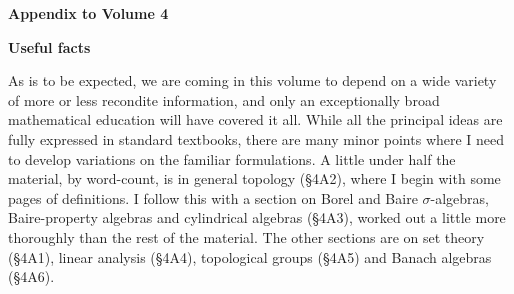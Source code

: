       
\def\chaptername{Appendix} 
\def\sectionname{Introduction} 
      
\gdef\topparagraph{} 
\gdef\bottomparagraph{Appendix to Vol.\ 4 {\it intro.}} 
      
\centerline{\bf Appendix to Volume 4} 
      
\medskip 
      
\centerline{\bf Useful facts} 
      
\medskip 
      
As is to be expected, we are coming in this volume to depend on a wide 
variety of more or less recondite information, and only an exceptionally 
broad mathematical education will have covered it all.   While all the 
principal ideas are fully expressed in standard textbooks, there are 
many minor points where I need to develop variations on the familiar 
formulations.   A little under half the material, by word-count, is in   
general topology (\S4A2), where I begin with some pages of definitions.   
I follow this with a section on Borel and Baire  
$\sigma$-algebras, Baire-property algebras and cylindrical algebras (\S4A3),  
worked out a little more thoroughly than the rest of the material.  
The other sections are on set theory (\S4A1), linear analysis (\S4A4), 
topological groups (\S4A5) and Banach algebras (\S4A6).    
 
      
\discrpage 
      
      
